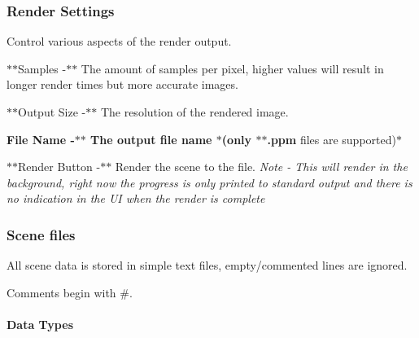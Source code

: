 \subsubsection*{Render Settings}

Control various aspects of the render output.


\begin{DoxyItemize}
\item $\ast$$\ast$\+Samples -\/$\ast$$\ast$ The amount of samples per pixel, higher values will result in longer render times but more accurate images.
\item $\ast$$\ast$\+Output Size -\/$\ast$$\ast$ The resolution of the rendered image.
\item {\bfseries File Name -\/$\ast$$\ast$ The output file name $\ast$(only $\ast$$\ast$.ppm} files are supported)$\ast$
\item $\ast$$\ast$\+Render Button -\/$\ast$$\ast$ Render the scene to the file. {\itshape Note -\/ This will render in the background, right now the progress is only printed to standard output and there is no indication in the U\+I when the render is complete}
\end{DoxyItemize}

\subsubsection*{Scene files}

All scene data is stored in simple text files, empty/commented lines are ignored.

Comments begin with \#.

\paragraph*{Data Types}


